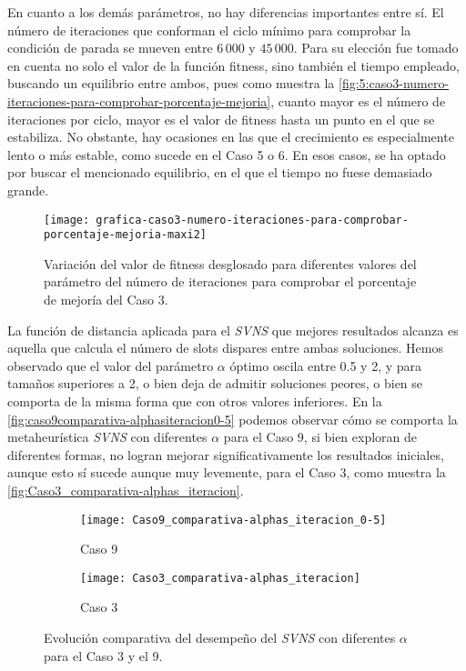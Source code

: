 En cuanto a los demás parámetros, no hay diferencias importantes entre sí. El número de iteraciones que conforman el ciclo mínimo para comprobar la condición de parada se mueven entre $6\,000$ y $45\,000$. Para su elección fue tomado en cuenta no solo el valor de la función fitness, sino también el tiempo empleado, buscando un equilibrio entre ambos, pues como muestra la \autoref{fig:5:caso3-numero-iteraciones-para-comprobar-porcentaje-mejoria}, cuanto mayor es el número de iteraciones por ciclo, mayor es el valor de fitness hasta un punto en el que se estabiliza. No obstante, hay ocasiones en las que el crecimiento es especialmente lento o más estable, como sucede en el Caso 5 o 6. En esos casos, se ha optado por buscar el mencionado equilibrio, en el que el tiempo no fuese demasiado grande.

\begin{figure}
	\centering
	\texttt{[image: grafica-caso3-numero-iteraciones-para-comprobar-porcentaje-mejoria-maxi2]}
	\caption{Variación del valor de fitness desglosado para diferentes valores del parámetro del número de iteraciones para comprobar el porcentaje de mejoría del Caso 3.}
	\label{fig:5:caso3-numero-iteraciones-para-comprobar-porcentaje-mejoria}
\end{figure}




La función de distancia aplicada para el \textit{SVNS} que mejores resultados alcanza es aquella que calcula el número de slots dispares entre ambas soluciones. Hemos observado que el valor del parámetro $\alpha$ óptimo oscila entre 0.5 y 2, y para tamaños superiores a 2, o bien deja de admitir soluciones peores, o bien se comporta de la misma forma que con otros valores inferiores. En la \autoref{fig:caso9comparativa-alphasiteracion0-5} podemos observar cómo se comporta la metaheurística \textit{SVNS} con diferentes $\alpha$ para el Caso 9, si bien exploran de diferentes formas, no logran mejorar significativamente los resultados iniciales, aunque esto sí sucede aunque muy levemente, para el Caso 3, como muestra la \autoref{fig:Caso3_comparativa-alphas_iteracion}.

\begin{figure}
	\begin{subfigure}{\linewidth}
	\texttt{[image: Caso9\_comparativa-alphas\_iteracion\_0-5]}
	\caption{Caso 9}
	\label{fig:caso9comparativa-alphasiteracion0-5}
	\centering
	\end{subfigure}

	\begin{subfigure}{\linewidth}
	\texttt{[image: Caso3\_comparativa-alphas\_iteracion]}
	\caption{Caso 3}
	\label{fig:Caso3_comparativa-alphas_iteracion}
	\centering
\end{subfigure}
	\caption{Evolución comparativa del desempeño del \textit{SVNS} con diferentes \textbf{$\alpha$} para el Caso 3 y el 9.}
\end{figure}

